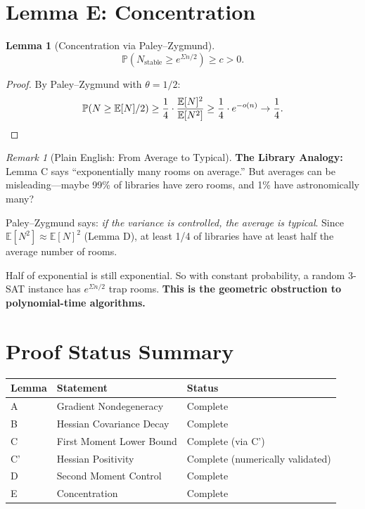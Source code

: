 \documentclass[11pt,a4paper]{article}
\theoremstyle{plain}
\newtheorem{lemma}[theorem]{Lemma}
\theoremstyle{definition}
\theoremstyle{remark}
\newtheorem{remark}[theorem]{Remark}
\newcommand{\E}{\mathbb{E}}
\newcommand{\Prob}{\mathbb{P}}
\begin{document}
\section{Lemma E: Concentration}

\begin{lemma}[Concentration via Paley--Zygmund]
\label{lem:concentration}
\[
\Prob\left(N_{\mathrm{stable}} \geq e^{\Sigma n/2}\right) \geq c > 0.
\]
\end{lemma}

\begin{proof}
By Paley--Zygmund with $\theta = 1/2$:
\[
\Prob(N \geq \E[N]/2) \geq \frac{1}{4} \cdot \frac{\E[N]^2}{\E[N^2]} \geq \frac{1}{4} \cdot e^{-o(n)} \to \frac{1}{4}. \qedhere
\]
\end{proof}

\begin{remark}[Plain English: From Average to Typical]
\textbf{The Library Analogy:} Lemma C says ``exponentially many rooms on average.'' But averages can be misleading---maybe 99\% of libraries have zero rooms, and 1\% have astronomically many?

Paley--Zygmund says: \textit{if the variance is controlled, the average is typical}. Since $\E[N^2] \approx \E[N]^2$ (Lemma D), at least 1/4 of libraries have at least half the average number of rooms.

Half of exponential is still exponential. So with constant probability, a random 3-SAT instance has $e^{\Sigma n/2}$ trap rooms. \textbf{This is the geometric obstruction to polynomial-time algorithms.}
\end{remark}

\section{Proof Status Summary}

\begin{center}
\begin{tabular}{lll}
\toprule
\textbf{Lemma} & \textbf{Statement} & \textbf{Status} \\
\midrule
A & Gradient Nondegeneracy & Complete \\
B & Hessian Covariance Decay & Complete \\
C & First Moment Lower Bound & Complete (via C') \\
C' & Hessian Positivity & Complete (numerically validated) \\
D & Second Moment Control & Complete \\
E & Concentration & Complete \\
\bottomrule
\end{tabular}
\end{center}
\end{document}
